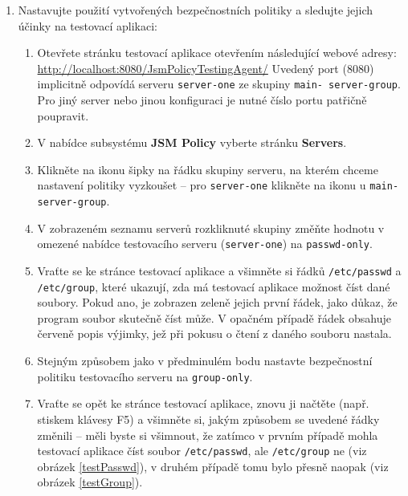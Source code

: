 \begin{enumerate}
  \item Nastavujte použití vytvořených bezpečnostních politiky a sledujte jejich účinky na testovací aplikaci:
  \begin{enumerate}
    \item Otevřete stránku testovací aplikace otevřením následující webové adresy:
      \newline\url{http://localhost:8080/JsmPolicyTestingAgent/}\newline
      Uvedený port (8080) implicitně odpovídá serveru {\tt server-one} ze skupiny {\tt main- server-group}. Pro jiný server nebo jinou konfiguraci je nutné číslo portu patřičně poupravit.
    \item V nabídce subsystému {\bf JSM Policy} vyberte stránku {\bf Servers}.
    \item Klikněte na ikonu šipky na řádku skupiny serveru, na kterém chceme nastavení politiky vyzkoušet -- pro {\tt server-one} klikněte na ikonu u {\tt main-server-group}.
    \item V zobrazeném seznamu serverů rozkliknuté skupiny změňte hodnotu v omezené nabídce testovacího serveru ({\tt server-one}) na {\tt passwd-only}.
    \item Vraťte se ke stránce testovací aplikace a všimněte si řádků {\tt /etc/passwd} a {\tt /etc/group}, které ukazují, zda má testovací aplikace možnost číst dané soubory. Pokud ano, je zobrazen zeleně jejich první řádek, jako důkaz, že program soubor skutečně číst může. V opačném případě řádek obsahuje červeně popis výjimky, jež při pokusu o čtení z daného souboru nastala.
    \item Stejným způsobem jako v předminulém bodu nastavte bezpečnostní politiku testovacího serveru na {\tt group-only}.
    \item Vraťte se opět ke stránce testovací aplikace, znovu ji načtěte (např. stiskem klávesy F5) a všimněte si, jakým způsobem se uvedené řádky změnili -- měli byste si všimnout, že zatímco v prvním případě mohla testovací aplikace číst soubor {\tt /etc/passwd}, ale {\tt /etc/group} ne (viz obrázek \ref{testPasswd}), v druhém případě tomu bylo přesně naopak (viz obrázek \ref{testGroup}).
  \end{enumerate}
\end{enumerate}

